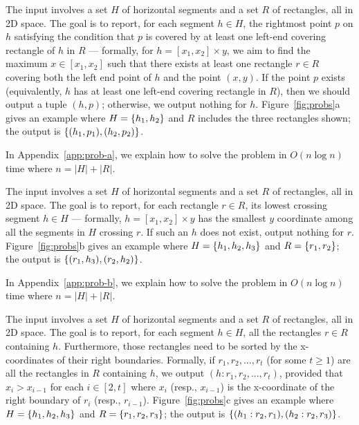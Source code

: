 \documentclass[sigconf]{acmart}
\def\vgap{\vspace{1mm}}
\def\extraspacing{\vspace{2mm} \noindent}
\begin{document}
\extraspacing {\bf Problem $\bm{\EuScript{A}}$.} The input involves a set $H$ of horizontal segments and a set $R$ of rectangles, all in 2D space. The goal is to report, for each segment $h \in H$, the rightmost point $p$ on $h$ satisfying the condition that $p$ is covered by at least one left-end covering rectangle of $h$ in $R$ --- formally, for $h = [x_1, x_2] \times y$, we aim to find the maximum $x \in [x_1, x_2]$ such that there exists at least one rectangle $r \in R$ covering both the left end point of $h$ and the point $(x, y)$. If the point $p$ exists (equivalently, $h$ has at least one left-end covering rectangle in $R$), then we should output a tuple $(h, p)$; otherwise, we output nothing for $h$. Figure~\ref{fig:probs}a gives an example where $H = \{h_1, h_2\}$ and $R$ includes the three rectangles shown; the output is $\{(h_1, p_1), (h_2, p_2)\}$.

\vgap

In Appendix~\ref{app:prob-a}, we explain how to solve the problem in $O(n \log n)$ time where $n = |H| + |R|$.

\extraspacing {\bf Problem $\bm{\EuScript{B}}$.} The input involves a set $H$ of horizontal segments and a set $R$ of rectangles, all in 2D space. The goal is to report, for each rectangle $r \in R$, its lowest crossing segment $h \in H$ --- formally, $h = [x_1, x_2] \times y$ has the smallest $y$ coordinate among all the segments in $H$ crossing $r$. If such an $h$ does not exist, output nothing for $r$.  Figure~\ref{fig:probs}b gives an example where $H = \{h_1, h_2, h_3\}$ and $R = \{r_1, r_2\}$; the output is $\{(r_1, h_3), (r_2, h_2)\}$.

\vgap

In Appendix~\ref{app:prob-b}, we explain how to solve the problem in $O(n \log n)$ time where $n = |H| + |R|$.

\extraspacing {\bf Problem $\bm{\EuScript{C}}$.} The input involves a set $H$ of horizontal segments and a set $R$ of rectangles, all in 2D space. The goal is to report, for each segment $h \in H$, all the rectangles $r \in R$ containing $h$. Furthermore, those rectangles need to be sorted by the x-coordinates of their right boundaries. Formally, if $r_1, r_2, ..., r_t$ (for some $t \ge 1$) are all the rectangles in $R$ containing $h$, we output $(h: r_1, r_2, ..., r_t)$, provided that $x_i > x_{i-1}$ for each $i \in [2, t]$ where $x_i$ (resp., $x_{i-1}$) is the x-coordinate of the right boundary of $r_i$ (resp., $r_{i-1}$). Figure~\ref{fig:probs}c gives an example where $H = \{h_1, h_2, h_3\}$ and $R = \{r_1, r_2, r_3\}$; the output is $\{(h_1: r_2, r_1), (h_2: r_2, r_3)\}$.
\end{document}
